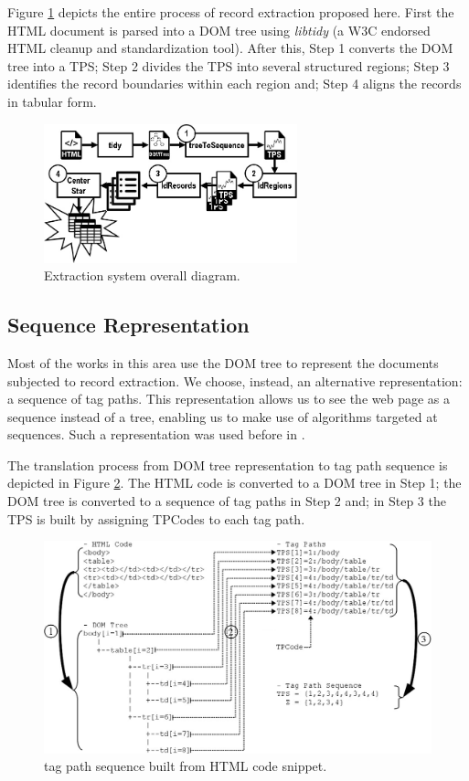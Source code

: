 \documentclass{vldb}
\begin{document}
Figure \ref{fig:overall} depicts the entire process of record extraction
proposed here. First the HTML document is parsed into a DOM tree using
\textit{libtidy}\cite{tidyw3c} (a W3C endorsed HTML cleanup and
standardization tool). After this, Step 1 converts the DOM tree into a TPS; Step
2 divides the TPS into several structured regions; Step 3 identifies the record
boundaries within each region and; Step 4 aligns the records in tabular form.

\begin{figure}[H]
  \centering
     \includegraphics[width=208pt]{img/proposal.jpg}
  \caption{Extraction system overall diagram.}
  \label{fig:overall}
\end{figure}

\subsection{Sequence Representation}\label{ss:seq}
Most of the works in this area use the DOM tree to represent the documents
subjected to record extraction. We choose, instead, an alternative
representation: a sequence of tag paths. This representation allows us to see
the web page as a sequence instead of a tree, enabling us to make use of
algorithms targeted at sequences. Such a representation was used before in
\cite{TPC09, SuffixTree12, TPS2013}.

The translation process from DOM tree representation to tag path sequence is
depicted in Figure \ref{fig:tree2seq}. The HTML code is converted to a DOM tree
in Step 1; the DOM tree is converted to a sequence of tag paths in Step 2 and;
in Step 3 the TPS is built by assigning TPCodes to each tag path. 

\begin{figure}[H]
  \centering
     \includegraphics[width=\columnwidth]{img/tree2seq.jpg}
  \caption{tag path sequence built from HTML code snippet.}
  \label{fig:tree2seq}
\end{figure}
\end{document}
